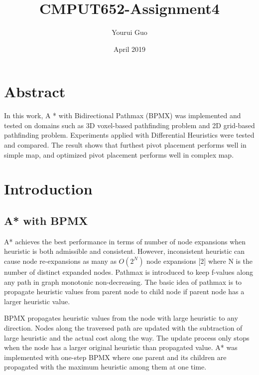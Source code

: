 \documentclass[twocolumn]{article}
\title{CMPUT652-Assignment4}
\author{Yourui Guo }
\date{April 2019}
\begin{document}
\maketitle

\section{Abstract}
In this work, A * with Bidirectional Pathmax (BPMX) was implemented and tested on domains such as 3D voxel-based pathfinding problem and 2D grid-based pathfinding problem. Experiments applied with Differential Heuristics were tested and compared. The result shows that furthest pivot placement performs well in simple map, and optimized pivot placement performs well in complex map. 

\section{Introduction}

\subsection{A* with BPMX}

A* achieves the best performance in terms of number of node expansions when heuristic is both admissible and consistent. However, inconsistent heuristic can cause node re-expansions as many as $O(2^N)$ node expansions [2] where N is the number of distinct expanded nodes. Pathmax is introduced to keep f-values along any path in graph monotonic non-decreasing. The basic idea of pathmax is to propagate heuristic values from parent node to child node if parent node has a larger heuristic value.

BPMX propagates heuristic values from the node with large heuristic to any direction. Nodes along the traversed path are updated with the subtraction of large heuristic and the actual cost along the way. The update process only stops when the node has a larger original heuristic than propagated value. A* was implemented with one-step BPMX where one parent and its children are propagated with the maximum heuristic among them at one time.
\end{document}
